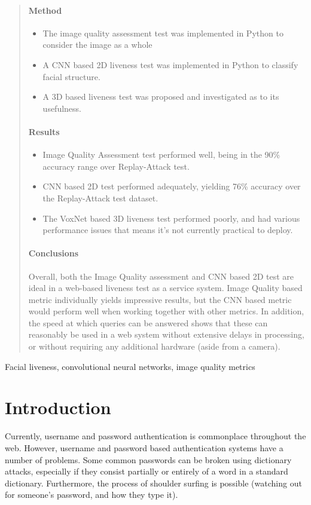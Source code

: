 \documentclass[10pt,a4paper]{article}
\begin{document}
\begin{abstract}
\paragraph{Method}
   \begin{itemize}
        \item The image quality assessment test was implemented in Python to consider the image as a whole
        \item A CNN based 2D liveness test was implemented in Python to classify facial structure.
        \item A 3D based liveness test was proposed and investigated as to its usefulness.
   \end{itemize}
\paragraph{Results}
    \begin{itemize}
        \item Image Quality Assessment test performed well, being in the 90\% accuracy range over Replay-Attack test.
        \item CNN based 2D test performed adequately, yielding 76\% accuracy over the Replay-Attack test dataset.
        \item The VoxNet based 3D liveness test performed poorly, and had various performance issues that means it's not currently practical to deploy.
    \end{itemize}
\paragraph{Conclusions}
    Overall, both the Image Quality assessment and CNN based 2D test are ideal in a web-based liveness test as a service system. Image Quality based metric individually yields
    impressive results, but the CNN based metric would perform well when working together with other metrics. In addition, the speed at which queries can be answered shows 
    that these can reasonably be used in a web system without extensive delays in processing, or without requiring any additional hardware (aside from a camera).
\end{abstract}

\begin{keywords}
Facial liveness, convolutional neural networks, image quality metrics
\end{keywords}

\section{Introduction}
    Currently, username and password authentication is commonplace throughout the web. However, username and password
    based authentication systems have a number of problems. Some common passwords can be broken using dictionary attacks,
    especially if they consist partially or entirely of a word in a standard dictionary. Furthermore, the process of shoulder surfing is possible (watching out
    for someone's password, and how they type it).
\end{document}
